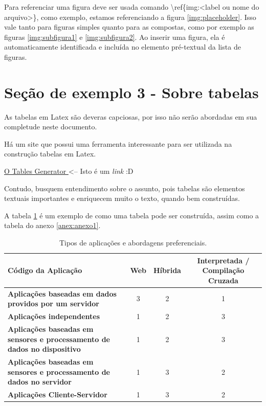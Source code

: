 Para referenciar uma figura deve ser usada comando \textbackslash ref\{img:<label ou nome do arquivo>\}, como exemplo, estamos referenciando a figura \ref{img:placeholder}. Isso vale tanto para figuras simples quanto para as compostas, como por exemplo as figuras \ref{img:subfigura1} e \ref{img:subfigura2}. Ao inserir uma figura, ela é automaticamente identificada e incluída no elemento pré-textual da lista de figuras.




\section{Seção de exemplo 3 - Sobre tabelas}

As tabelas em Latex são deveras capciosas, por isso não serão abordadas em sua completude neste documento.

Há um site que possui uma ferramenta interessante para ser utilizada na construção tabelas em Latex.

\centerline{\href{https://www.tablesgenerator.com/}{ O Tables Generator } <-- Isto é um \textit{link} :D}

Contudo, busquem entendimento sobre o assunto, pois tabelas são elementos textuais importantes e enriquecem muito o texto, quando bem construídas.

A tabela \ref{tab:crossplatform} é um exemplo de como uma tabela pode ser construída, assim como a tabela do anexo \ref{anex:anexo1}.

\begin{table}[!htb]
	\centering
	\caption{\label{tab:crossplatform} Tipos de aplicações e abordagens preferenciais.}
	\begin{adjustbox}{max width=\textwidth}
		\begin{tabular}{@{} p{5cm} |c|c|c| @{}}
		\toprule
		\textbf{Código da Aplicação} & \textbf{Web} & \textbf{Híbrida} & \textbf{Interpretada / Compilação Cruzada} \\ \hline

		\textbf{Aplicações baseadas em dados providos por um servidor} &
			3 & 2 & 1
		\\ \hline

		\textbf{Aplicações independentes} & 1 & 2 & 3\\ \hline

		\textbf{Aplicações baseadas em sensores e processamento de dados no dispositivo} & 1 & 2 & 3\\ \hline

		\textbf{Aplicações baseadas em sensores e processamento de dados no servidor} & 1 & 3 & 2\\ \hline

		\textbf{Aplicações Cliente-Servidor} & 1 & 3 & 2 \\ \bottomrule
	\end{tabular}
	\end{adjustbox}
\end{table}

